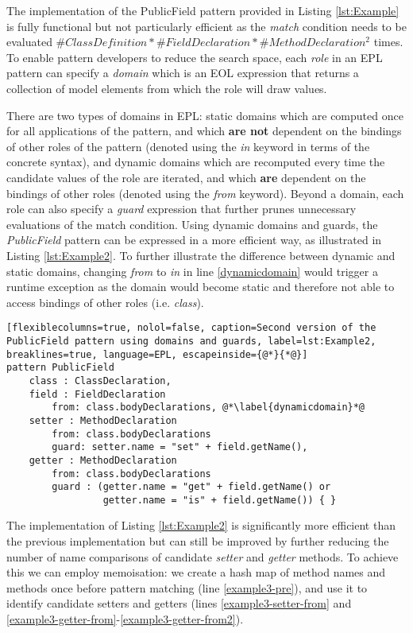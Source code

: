 The implementation of the PublicField pattern provided in Listing \ref{lst:Example} is fully functional but not particularly efficient as the \emph{match} condition needs to be evaluated $\#ClassDefinition * \#FieldDeclaration * \#MethodDeclaration^{2}$ times. To enable pattern developers to reduce the search space, each \emph{role} in an EPL pattern can specify a \emph{domain} which is an EOL expression that returns a collection of model elements from which the role will draw values.

There are two types of domains in EPL: static domains which are computed once for all applications of the pattern, and which \textbf{are not} dependent on the bindings of other roles of the pattern (denoted using the \emph{in} keyword in terms of the concrete syntax), and dynamic domains which are recomputed every time the candidate values of the role are iterated, and which \textbf{are} dependent on the bindings of other roles (denoted using the \emph{from} keyword). Beyond a domain, each role can also specify a \emph{guard} expression that further prunes unnecessary evaluations of the match condition. Using dynamic domains and guards, the \emph{PublicField} pattern can be expressed in a more efficient way, as illustrated in Listing \ref{lst:Example2}. To further illustrate the difference between dynamic and static domains, changing \emph{from} to \emph{in} in line \ref{dynamicdomain} would trigger a runtime exception as the domain would become static and therefore not able to access bindings of other roles (i.e. \emph{class}).
\clearpage
\begin{lstlisting}[flexiblecolumns=true, nolol=false, caption=Second version of the PublicField pattern using domains and guards, label=lst:Example2, breaklines=true, language=EPL, escapeinside={@*}{*@}]
pattern PublicField
	class : ClassDeclaration,
	field : FieldDeclaration
		from: class.bodyDeclarations, @*\label{dynamicdomain}*@
	setter : MethodDeclaration
		from: class.bodyDeclarations
		guard: setter.name = "set" + field.getName(),
	getter : MethodDeclaration
		from: class.bodyDeclarations 
		guard : (getter.name = "get" + field.getName() or
		         getter.name = "is" + field.getName()) { }
\end{lstlisting}

The implementation of Listing \ref{lst:Example2} is significantly more efficient than the previous implementation but can still be improved by further reducing the number of name comparisons of candidate \emph{setter} and \emph{getter} methods. To achieve this we can employ memoisation: we create a hash map of method names and methods once before pattern matching (line \ref{example3-pre}), and use it to identify candidate setters and getters (lines \ref{example3-setter-from} and \ref{example3-getter-from}-\ref{example3-getter-from2}).

